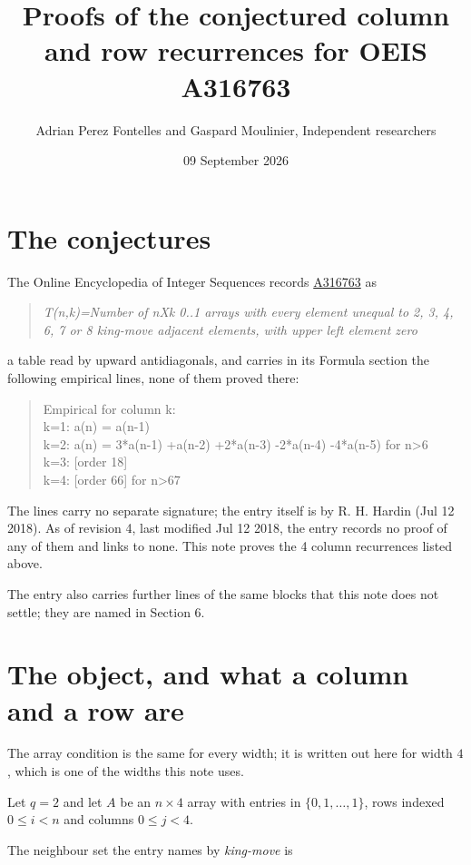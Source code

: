\documentclass[11pt]{article}
\title{Proofs of the conjectured column and row recurrences for OEIS A316763}
\author{Adrian Perez Fontelles and Gaspard Moulinier, Independent researchers}
\date{09 September 2026}
\theoremstyle{definition}
\begin{document}
\maketitle
\section{The conjectures}

The Online Encyclopedia of Integer Sequences records \href{https://oeis.org/A316763}{A316763} as

\begin{quote}\itshape T(n,k)=Number of nXk 0..1 arrays with every element unequal to 2, 3, 4, 6, 7 or 8 king-move adjacent elements, with upper left element zero\end{quote}

a table read by upward antidiagonals, and carries in its Formula section the following empirical lines, none of them proved there:

\begin{quote}\ttfamily Empirical for column k:\\
k=1: a(n) = a(n-1)\\k=2: a(n) = 3*a(n-1) +a(n-2) +2*a(n-3) -2*a(n-4) -4*a(n-5) for n>6\\k=3: [order 18]\\k=4: [order 66] for n>67\end{quote}

The lines carry no separate signature; the entry itself is by R. H. Hardin (Jul 12 2018). As of revision 4, last modified Jul 12 2018, the entry records no proof of any of them and links to none. This note proves the 4 column recurrences listed above.

The entry also carries further lines of the same blocks that this note does not settle; they are named in Section 6.

\section{The object, and what a column and a row are}

The array condition is the same for every width; it is written out here for width $4$, which is one of the widths this note uses.

Let $q = 2$ and let $A$ be an $n \times 4$ array with entries in $\{0,1,\dots,1\}$, rows indexed $0 \le i < n$ and columns $0 \le j < 4$.

The neighbour set the entry names by {\itshape king-move} is
\end{document}
